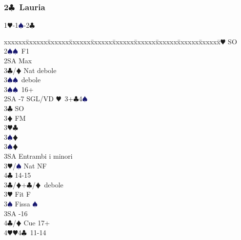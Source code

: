 \documentclass[a4paper,italian]{article}
\newcommand{\BC}{\textcolor{OliveGreen}{$\clubsuit$}}
\newcommand{\BD}{\textcolor{RedOrange}{$\vardiamondsuit$}}
\newcommand{\BH}{\textcolor{Red2}{$\varheartsuit${}}}
\newcommand{\BS}{\textcolor{MidnightBlue}{$\spadesuit${}}}
\newcommand{\pdfc}{\texorpdfstring{\BC{}}{C}}
\newenvironment{bidtable}
{\begin{tabbing}

    xxxxxx\=xxxxxx\=xxxxxx\=xxxxxx\=xxxxxx\=xxxxxx\=xxxxxx\=xxxxxx\=xxxxxx\=xxxxxx\=\kill}
{\end{tabbing} }%
\begin{document}
\begin{multicols*}{2}
                                        \subsubsection{2\pdfc\ Lauria} \label{lauria}
                                        1\BH-1\BS-2\BC
                                        \begin{bidtable}
                                            2\BH \> SO\+\\
                                            2\BS {}\BS\ F1\+\\
                                            2SA \> Max\\
                                            3\BC/\BD \> Nat debole\\
                                            3\BS {}\BS\ debole\-\\
                                            3\BS {}\BS\ 16+\-\\
                                            2SA -7 SGL/VD \BH\ 3+\BC 4\BS \+\\
                                            3\BC \> SO\\
                                            3\BD \> FM\+\\
                                            3\BH {}\BC \+\\
                                            3\BS {}\BD \-\\
                                            3\BS {}\BD \\
                                            3SA \> Entrambi i minori\-\\
                                            3\BH/\BS \> Nat NF\\
                                            4\BC {} 14-15\-\\
                                            3\BC/\BD {}+\BC /\BD\ debole\\
                                            3\BH \> Fit F\+\\
                                            3\BS \> Fissa \BS\\
                                            3SA -16\\
                                            4\BC/\BD \> Cue 17+\\
                                            4\BH {}\BH 4\BC\ 11-14\-\\

\end{bidtable}
\end{multicols*}
\end{document}
